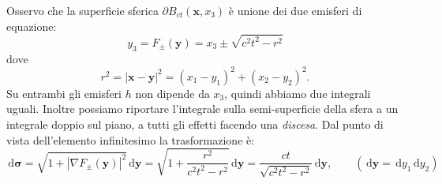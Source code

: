 \documentclass[10pt,a4paper,twoside,openright]{book}
\newcommand{\x}{\mathbf{x}}
\newcommand{\y}{\mathbf{y}}
\newcommand{\sigg}{\bm{\sigma}}
\newcommand{\de}{\,\mathrm d}
\newcommand{\dy}{\de y}
\newcommand{\dyy}{\de \y}
\newcommand{\dsig}{\de \sigg}
\begin{document}
Osservo che la superficie sferica $\displaystyle \partial B_{ct}(\x ,x_{3})$ è unione dei due emisferi di equazione:
\begin{equation*}
	y_{3} =F_{\pm }(\y) =x_{3} \pm \sqrt{c^{2} t^{2} -r^{2}}
\end{equation*}
dove
\begin{equation*}
	r^{2} =| \x -\y| ^{2} =(x_{1} -y_{1})^{2} +(x_{2} -y_{2})^{2} .
\end{equation*}
Su entrambi gli emisferi $h$ non dipende da $\displaystyle x_{3}$, quindi abbiamo due integrali uguali. Inoltre possiamo riportare l'integrale sulla semi-superficie della sfera a un integrale doppio sul piano, a tutti gli effetti facendo una \textit{discesa}. Dal punto di vista dell'elemento infinitesimo la trasformazione è:
\begin{equation*}
	\dsig =\sqrt{1+| \nabla F_{\pm }(\y)| ^{2}} \dyy =\sqrt{1+\frac{r^{2}}{c^{2} t^{2} -r^{2}}} \dyy =\frac{ct}{\sqrt{c^{2} t^{2} -r^{2}}} \dyy,\qquad  (\dyy =\dy_{1} \dy_{2})
\end{equation*}
\end{document}
